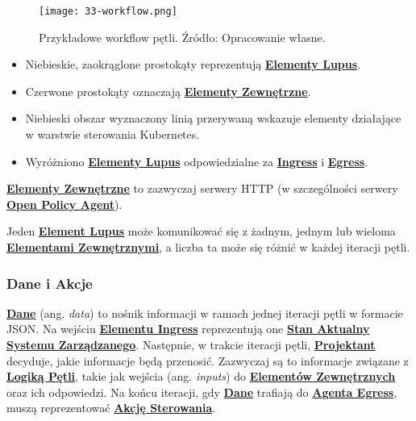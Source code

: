 \begin{figure}[!h]
    \centering \texttt{[image: 33-workflow.png]}
    \caption{Przykładowe workflow pętli. Źródło: Opracowanie własne.}\label{fig:33-workflow}
\end{figure}

\begin{itemize}
    \item Niebieskie, zaokrąglone prostokąty reprezentują \hyperlink{def:element-lupus}{\textbf{Elementy Lupus}}.
    \item Czerwone prostokąty oznaczają \hyperlink{def:element-zewnetrzny}{\textbf{Elementy Zewnętrzne}}.
    \item Niebieski obszar wyznaczony linią przerywaną wskazuje elementy działające w warstwie sterowania Kubernetes. 
    \item Wyróżniono \hyperlink{def:element-lupus}{\textbf{Elementy Lupus}} odpowiedzialne za \hyperlink{def:interfejs-lupin}{\textbf{Ingress}} i \hyperlink{def:interfejs-lupout}{\textbf{Egress}}.
\end{itemize}

\hyperlink{def:element-zewnetrzny}{\textbf{Elementy Zewnętrzne}} to zazwyczaj serwery HTTP (w szczególności serwery \hyperlink{def:opa}{\textbf{Open Policy Agent}}).

Jeden \hyperlink{def:element-lupus}{\textbf{Element Lupus}} może komunikować się z żadnym, jednym lub wieloma \hyperlink{def:element-zewnetrzny}{\textbf{Elementami Zewnętrznymi}}, a liczba ta może się różnić w każdej iteracji pętli.

\subsubsection{Dane i Akcje}

\hyperlink{def:data}{\textbf{Dane}} (ang. \textit{data}) to nośnik informacji w ramach jednej iteracji pętli w formacie JSON. Na wejściu \hyperlink{def:element-ingres}{\textbf{Elementu Ingress}} reprezentują one \hyperlink{def:stan-aktualny}{\textbf{Stan Aktualny}} \hyperlink{def:system-zarzadzany}{\textbf{Systemu Zarządzanego}}. Następnie, w trakcie iteracji pętli, \hyperlink{def:projektant}{\textbf{Projektant}} decyduje, jakie informacje będą przenosić. Zazwyczaj są to informacje związane z \hyperlink{def:logika-petli}{\textbf{Logiką Pętli}}, takie jak wejścia (ang. \textit{inputs}) do \hyperlink{def:element-zewnetrzny}{\textbf{Elementów Zewnętrznych}} oraz ich odpowiedzi. Na końcu iteracji, gdy \hyperlink{def:dane}{\textbf{Dane}} trafiają do \hyperlink{def:agent-egress}{\textbf{Agenta Egress}}, muszą reprezentować \hyperlink{def:akcja-sterujaca}{\textbf{Akcję Sterowania}}. 

